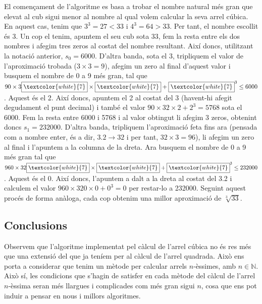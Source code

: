 \documentclass[11pt,a4paper]{article}
\theoremstyle{definition}
\begin{document}
El començament de l'algoritme es basa a trobar el nombre natural més gran que elevat al cub sigui menor al nombre al qual volem calcular la seva arrel cúbica. En aquest cas, tenim que $3^3=27<33$ i $4^3=64>33$. Per tant, el nombre escollit és 3. Un cop el tenim, apuntem el seu cub sota 33, fem la resta entre els dos nombres i afegim tres zeros al costat del nombre resultant. Així doncs, utilitzant la notació anterior, $s_0=6000$. D'altra banda, sota el 3, tripliquem el valor de l'aproximació trobada ($3\times 3=9$), afegim un zero al final d'aquest valor i busquem el nombre de 0 a 9 més gran, tal que $90\times 3\boxed{\textcolor{white}{7}}\times\boxed{\textcolor{white}{7}}+\boxed{\textcolor{white}{7}}^3\leq6000$. Aquest és el 2. Així doncs, apuntem el 2 al costat del 3  (havent-hi afegit degudament el punt decimal) i també el valor $90\times 32\times2+2^3=5768$ sota el 6000. Fem la resta entre 6000 i 5768 i al valor obtingut li afegim 3 zeros, obtenint doncs $s_1=232000$. D'altra banda, tripliquem l'aproximació feta fins ara (pensada com a nombre enter, és a dir, $3.2\to32$ i per tant, $32\times 3=96$), li afegim un zero al final i l'apuntem a la columna de la dreta. Ara busquem el nombre de 0 a 9 més gran tal que $960\times 32\boxed{\textcolor{white}{7}}\times\boxed{\textcolor{white}{7}}+\boxed{\textcolor{white}{7}}^3\leq232000$. Aquest és el 0. Així doncs, l'apuntem a dalt a la dreta al costat del 3.2 i calculem el valor $960\times 320\times0+0^3=0$ per restar-lo a 232000. Seguint aquest procés de forma anàloga, cada cop obtenim una millor aproximació de $\sqrt[3]{33}$.
\subsection{Conclusions}
Observem que l'algoritme implementat pel càlcul de l'arrel cúbica no és res més que una extensió del que ja teníem per al càlcul de l'arrel quadrada. Això ens porta a considerar que tenim un mètode per calcular arrels $n$-èssimes, amb $n\in\mathbb{N}$. Això sí, les condicions que s'hagin de satisfer en cada mètode del càlcul de l'arrel $n$-èssima seran més llargues i complicades com més gran sigui $n$, cosa que ens pot induir a pensar en nous i millors algoritmes.
\printbibliography[heading=bibintoc]
\end{document}
